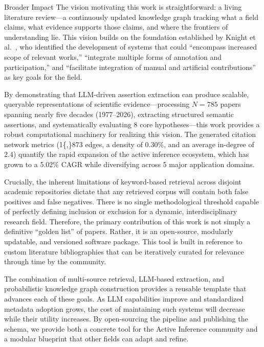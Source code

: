 \documentclass[
  ignorenonframetext,
]{beamer}
\begin{document}
\begin{frame}{Broader Impact}
\protect{}\label{broader-impact}
The vision motivating this work is straightforward: a living literature
review---a continuously updated knowledge graph tracking what a field
claims, what evidence supports those claims, and where the frontiers of
understanding lie. This vision builds on the foundation established by
Knight et al.~\citep{knight2022fep}, who identified the development of
systems that could ``encompass increased scope of relevant works,''
``integrate multiple forms of annotation and participation,'' and
``facilitate integration of manual and artificial contributions'' as key
goals for the field.

By demonstrating that LLM-driven assertion extraction can produce
scalable, queryable representations of scientific evidence---processing
\(N = 785\) papers spanning nearly five decades (1977--2026), extracting
structured semantic assertions, and systematically evaluating 8 core
hypotheses---this work provides a robust computational machinery for
realizing this vision. The generated citation network metrics (1\{,\}873
edges, a density of 0.30\%, and an average in-degree of 2.4) quantify
the rapid expansion of the active inference ecosystem, which has grown
to a 5.02\% CAGR while diversifying across 5 major application domains.

Crucially, the inherent limitations of keyword-based retrieval across
disjoint academic repositories dictate that any retrieved corpus will
contain both false positives and false negatives. There is no single
methodological threshold capable of perfectly defining inclusion or
exclusion for a dynamic, interdisciplinary research field. Therefore,
the primary contribution of this work is not simply a definitive
``golden list'' of papers. Rather, it is an open-source, modularly
updatable, and versioned software package. This tool is built in
reference to custom literature bibliographies that can be iteratively
curated for relevance through time by the community.

The combination of multi-source retrieval, LLM-based extraction, and
probabilistic knowledge graph construction provides a reusable template
that advances each of these goals. As LLM capabilities improve and
standardized metadata adoption grows, the cost of maintaining such
systems will decrease while their utility increases. By open-sourcing
the pipeline and publishing the schema, we provide both a concrete tool
for the Active Inference community and a modular blueprint that other
fields can adapt and refine.


\end{frame}
\end{document}
